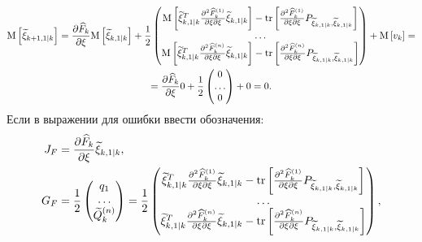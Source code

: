 \begin{multline} \label{equation:filtering:in_states:extended_kalman:prediction_error_expectation}
    \mathrm{M} \left [ \widetilde{\xi}_{k+1,1|k} \right ]
    = \frac{\partial \widehat{F}_k}{\partial \xi} \mathrm{M} \left [ \widetilde{\xi}_{k,1|k} \right ]
        + \frac{1}{2}
            \begin{pmatrix}
                \mathrm{M} \left [ \widetilde{\xi}_{k,1|k}^T \frac{\partial^2 \widehat{F}_k^{(1)}}{{\partial \xi}{\partial \xi}} \widetilde{\xi}_{k,1|k} \right ] - \mathrm{tr} \left [ \frac{\partial^2 \widehat{F}_k^{(1)}}{{\partial \xi}{\partial \xi}} P_{\widetilde{\xi}_{k,1|k}, \widetilde{\xi}_{k,1|k}} \right ] \\
                \dots \\
                \mathrm{M} \left [ \widetilde{\xi}_{k,1|k}^T \frac{\partial^2 \widehat{F}_k^{(n)}}{{\partial \xi}{\partial \xi}} \widetilde{\xi}_{k,1|k} \right ] - \mathrm{tr} \left [ \frac{\partial^2 \widehat{F}_k^{(n)}}{{\partial \xi}{\partial \xi}} P_{\widetilde{\xi}_{k,1|k}, \widetilde{\xi}_{k,1|k}} \right ]
            \end{pmatrix}
        + \mathrm{M} \left [ v_k \right ] = \\
    = \frac{\partial \widehat{F}_k}{\partial \xi} 0
        + \frac{1}{2}
            \begin{pmatrix}
                0 \\
                \dots \\
                0
            \end{pmatrix}
        + 0
    = 0.
\end{multline}
Если в выражении для ошибки ввести обозначения:
\begin{align*}
    J_F & = \frac{\partial \widehat{F}_k}{\partial \xi} \widetilde{\xi}_{k,1|k} , \\
    G_F &
        = \frac{1}{2}
            \begin{pmatrix}
                q_1 \\
                \dots \\
                \widetilde{Q}_{k}^{(n)}
            \end{pmatrix}
        = \frac{1}{2}
            \begin{pmatrix}
                \widetilde{\xi}_{k,1|k}^T \frac{\partial^2 \widehat{F}_k^{(1)}}{{\partial \xi}{\partial \xi}} \widetilde{\xi}_{k,1|k} - \mathrm{tr} \left [ \frac{\partial^2 \widehat{F}_k^{(1)}}{{\partial \xi}{\partial \xi}} P_{\widetilde{\xi}_{k,1|k}, \widetilde{\xi}_{k,1|k}} \right ] \\
                \dots \\
                \widetilde{\xi}_{k,1|k}^T \frac{\partial^2 \widehat{F}_k^{(n)}}{{\partial \xi}{\partial \xi}} \widetilde{\xi}_{k,1|k} - \mathrm{tr} \left [ \frac{\partial^2 \widehat{F}_k^{(n)}}{{\partial \xi}{\partial \xi}} P_{\widetilde{\xi}_{k,1|k}, \widetilde{\xi}_{k,1|k}} \right ]
            \end{pmatrix} , \\
\end{align*}
